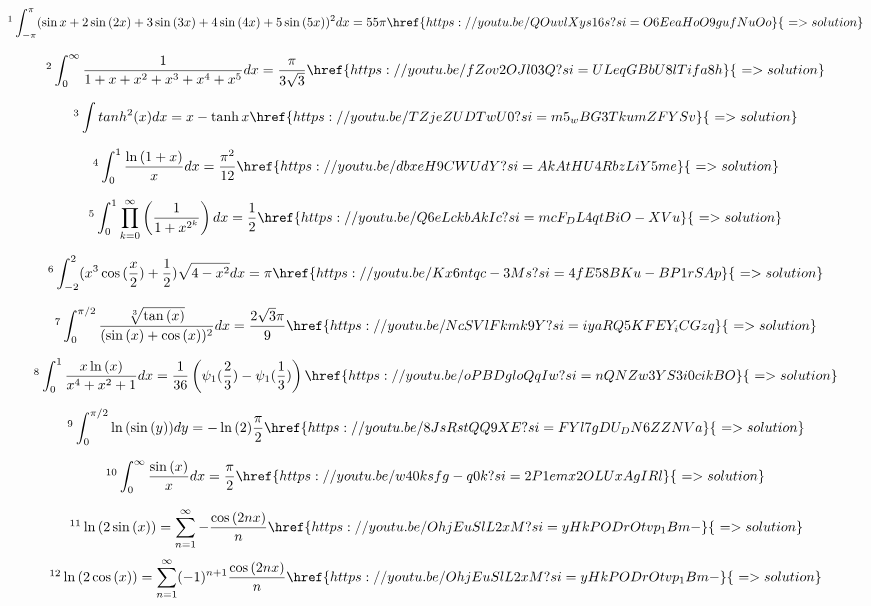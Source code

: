 \documentclass[12pt]{article}
\begin{document}
\[\footnote{The Trigonometric BUS Integral}  \int_{-\pi}^{\pi} (\sin{x} + 2 \sin{(2x)} + 3 \sin{(3x)} + 4 \sin{(4x)} + 5 \sin{(5x)} ) ^2 dx   = 55\pi \href{https://youtu.be/QOuvlXys16s?si=O6EeaHoO9gufNuOo}{\,\,=>solution}  \]

\[\footnote{Bro, Are you joking?}  \int_{0}^{\infty} \frac{1}{1+x+x^2+x^3+x^4+x^5} dx = \frac{\pi}{3\sqrt{3}} \href{https://youtu.be/fZov2OJl03Q?si=ULeqGBbU8lTifa8h}{\,\,=>solution}  \]

\[ \footnote{How easy is MIT Integration Bee?} \int tanh^2(x) dx = x-\tanh{x}  \href{https://youtu.be/TZjeZUDTwU0?si=m5_wBG3TkumZFYSv}{\,\,=>solution}  \]

\[ \footnote{Integrating using series in MIT Integration Bee} \int_0^1 \frac{\ln{(1+x)}}{x} dx =\frac{\pi^2}{12} \href{https://youtu.be/dbxeH9CWUdY?si=AkAtHU4RbzLiY5me}{\,\,=>solution}   \]

\[ \footnote{This is the most easiest difficult question in MIT Integration Bee} \int_0^1 \prod_{k=0}^\infty \left(\frac{1}{1+x^{2^k}}\right) dx   = \frac{1}{2} \href{https://youtu.be/Q6eLckbAkIc?si=mcF_DL4qtBiO-XVu}{\,\,=>solution}   \]

\[ \footnote{Chinese University Wifi Password} \int_{-2}^2 (x^3\cos{(\frac{x}{2})} + \frac{1}{2})\sqrt{4-x^2} dx   = \pi  \href{https://youtu.be/Kx6ntqc-3Ms?si=4fE58BKu-BP1rSAp}{\,\,=>solution}  \]

\[ \footnote{Beta Gamma Function in MIT Integration Bee} \int_0^{\pi/2} \frac{\sqrt[3]{\tan{(x)}}}{(\sin{(x)}+\cos{(x)})^2} dx =\frac{2\sqrt{3}\pi}{9}    \href{https://youtu.be/NcSVlFkmk9Y?si=iyaRQ5KFEY_iCGzq}{\,\,=>solution}  \]

\[ \footnote{Stepping on some hard integrals} \int_0^{1} \frac{x \ln{(x)}}{x^4+x^2+1} dx = \frac{1}{36} \left( \psi_1{(\frac{2}{3})} - \psi_1{(\frac{1}{3})} \right)   \href{https://youtu.be/oPBDgloQqIw?si=nQNZw3YS3i0cikBO}{\,\,=>solution}   \]


 \[ \footnote{ proof of why $\int_0^{\pi/2} \ln{(\sin{(y)})} dy = -\ln{(2)} \frac{\pi}{2} $ }  \int_0^{\pi/2}\ln{(\sin{(y)})}dy = -\ln{(2)} \frac{\pi}{2} \href{https://youtu.be/8JsRstQQ9XE?si=FYl7gDU_DN6ZZNVa}{\,\,=>solution}   \]

\[ \footnote{ proof of Dirichlet Integral}  \int_0^{\infty} \frac{\sin{(x)}}{x} dx  = \frac{\pi}{2} \href{https://youtu.be/w40ksfg-q0k?si=2P1emx2OLUxAgIRl}{\,\,=>solution}   \]

\[ \footnote{Two wonderful Series from Dr. Peyam-i} \ln{(2\sin{(x)})} = \sum_{n=1}^{\infty} - \frac{\cos{(2nx)}}{n} \href{https://youtu.be/OhjEuSlL2xM?si=yHkPODrOtvp_1Bm-}{\,\,=>solution}   \]
\[ \footnote{Two wonderful Series from Dr. Peyam-ii}
\ln{(2\cos{(x)})} = \sum_{n=1}^{\infty} (-1)^{n+1} \frac{\cos{(2nx)}}{n}  \href{https://youtu.be/OhjEuSlL2xM?si=yHkPODrOtvp_1Bm-}{\,\,=>solution}   \]
\end{document}
